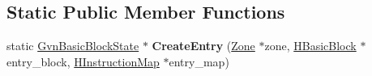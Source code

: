 \subsection*{Static Public Member Functions}
\begin{DoxyCompactItemize}
\item 
static \hyperlink{classv8_1_1internal_1_1_gvn_basic_block_state}{Gvn\+Basic\+Block\+State} $\ast$ {\bfseries Create\+Entry} (\hyperlink{classv8_1_1internal_1_1_zone}{Zone} $\ast$zone, \hyperlink{classv8_1_1internal_1_1_h_basic_block}{H\+Basic\+Block} $\ast$entry\+\_\+block, \hyperlink{classv8_1_1internal_1_1_h_instruction_map}{H\+Instruction\+Map} $\ast$entry\+\_\+map)\hypertarget{classv8_1_1internal_1_1_gvn_basic_block_state_a1d9de2e87efd8ad965f528ee52d91af1}{}\label{classv8_1_1internal_1_1_gvn_basic_block_state_a1d9de2e87efd8ad965f528ee52d91af1}

\end{DoxyCompactItemize}
